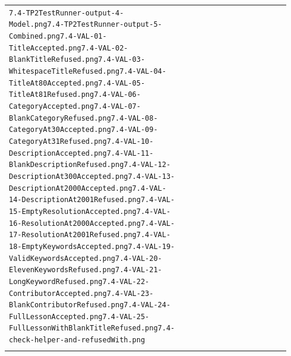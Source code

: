 \documentclass[10pt]{article}
\begin{document}
\begin{longtable}{@{}>{\raggedright\arraybackslash}p{0.07\linewidth} >{\raggedright\arraybackslash}p{0.33\linewidth} >{\raggedright\arraybackslash}p{0.54\linewidth}@{}}
\texttt{7.4-TP2TestRunner-output-4-Model.png}\newline \texttt{7.4-TP2TestRunner-output-5-Combined.png}\newline \texttt{7.4-VAL-01-TitleAccepted.png}\newline \texttt{7.4-VAL-02-BlankTitleRefused.png}\newline \texttt{7.4-VAL-03-WhitespaceTitleRefused.png}\newline \texttt{7.4-VAL-04-TitleAt80Accepted.png}\newline \texttt{7.4-VAL-05-TitleAt81Refused.png}\newline \texttt{7.4-VAL-06-CategoryAccepted.png}\newline \texttt{7.4-VAL-07-BlankCategoryRefused.png}\newline \texttt{7.4-VAL-08-CategoryAt30Accepted.png}\newline \texttt{7.4-VAL-09-CategoryAt31Refused.png}\newline \texttt{7.4-VAL-10-DescriptionAccepted.png}\newline \texttt{7.4-VAL-11-BlankDescriptionRefused.png}\newline \texttt{7.4-VAL-12-DescriptionAt300Accepted.png}\newline \texttt{7.4-VAL-13-DescriptionAt2000Accepted.png}\newline \texttt{7.4-VAL-14-DescriptionAt2001Refused.png}\newline \texttt{7.4-VAL-15-EmptyResolutionAccepted.png}\newline \texttt{7.4-VAL-16-ResolutionAt2000Accepted.png}\newline \texttt{7.4-VAL-17-ResolutionAt2001Refused.png}\newline \texttt{7.4-VAL-18-EmptyKeywordsAccepted.png}\newline \texttt{7.4-VAL-19-ValidKeywordsAccepted.png}\newline \texttt{7.4-VAL-20-ElevenKeywordsRefused.png}\newline \texttt{7.4-VAL-21-LongKeywordRefused.png}\newline \texttt{7.4-VAL-22-ContributorAccepted.png}\newline \texttt{7.4-VAL-23-BlankContributorRefused.png}\newline \texttt{7.4-VAL-24-FullLessonAccepted.png}\newline \texttt{7.4-VAL-25-FullLessonWithBlankTitleRefused.png}\newline \texttt{7.4-check-helper-and-refusedWith.png}} \\ \addlinespace[3pt]
\bottomrule\end{longtable}



\end{document}
